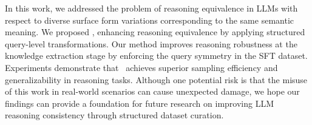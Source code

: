 In this work, we addressed the problem of reasoning equivalence in LLMs with respect to diverse surface form variations corresponding to the same semantic meaning. We proposed \methodlong, enhancing reasoning equivalence by applying structured query-level transformations. Our method improves reasoning robustness at the knowledge extraction stage by enforcing the query symmetry in the SFT dataset.
Experiments demonstrate that \method\ achieves superior sampling efficiency and generalizability in reasoning tasks. Although one potential risk is that the misuse of this work in real-world scenarios can cause unexpected damage, we hope our findings can provide a foundation for future research on improving LLM reasoning consistency through structured dataset curation. 
